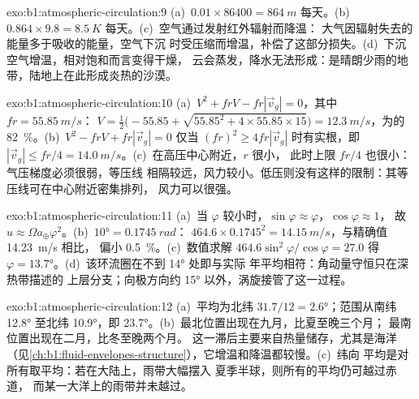 \begin{solution}{exo:b1:atmospheric-circulation:9}
(a)~$\num{0.01} \times \num{86400} = \qty{864}{m}$ 每天。(b)~$0.864 \times 9.8 =
\qty{8.5}{K}$ 每天。(c)~空气通过发射红外辐射而降温：
大气因辐射失去的能量多于吸收的能量，空气下沉
时受压缩而增温，补偿了这部分损失。(d)~下沉空气增温，相对饱和而言变得干燥，
云会蒸发，降水无法形成：是晴朗少雨的地带，陆地上在此形成炎热的沙漠。
\end{solution}

\begin{solution}{exo:b1:atmospheric-circulation:10}
(a)~$V^2 + frV - fr|\vec v_g| = 0$，其中 $fr = \qty{55.85}{m/s}$：
$V = \tfrac12\bigl(-55.85 + \sqrt{55.85^2 + 4 \times 55.85 \times 15}\bigr) =
\qty{12.3}{m/s}$，为的 \qty{82}{\percent}。(b)~$V^2 - frV +
fr|\vec v_g| = 0$ 仅当 $(fr)^2 \geq 4fr|\vec v_g|$ 时有实根，即
$|\vec v_g| \leq fr/4 = \qty{14.0}{m/s}$。(c)~在高压中心附近，$r$ 很小，
此时上限 $fr/4$ 也很小：气压梯度必须很弱，等压线
相隔较远，风力较小。低压则没有这样的限制：其等压线可在中心附近密集排列，
风力可以很强。
\end{solution}

\begin{solution}{exo:b1:atmospheric-circulation:11}
(a)~当 $\varphi$ 较小时，$\sin\varphi \approx \varphi$，$\cos\varphi \approx 1$，
故 $u \approx \Omega a_\oplus\varphi^2$。(b)~$\ang{10} = \qty{0.1745}{rad}$：
$464.6 \times 0.1745^2 = \qty{14.15}{m/s}$，与精确值 \qty{14.23}{m/s} 相比，
偏小 \qty{0.5}{\percent}。(c)~数值求解 $464.6\sin^2\varphi/\cos\varphi = 27.0$
得 $\varphi = \ang{13.7}$。(d)~该环流圈在不到 \ang{14} 处即与实际
年平均相符：角动量守恒只在深热带描述的
上层分支；向极方向约
\ang{15} 以外，涡旋接管了这一过程。
\end{solution}

\begin{solution}{exo:b1:atmospheric-circulation:12}
(a)~平均为北纬 $31.7/12 = \ang{2.6}$；范围从南纬 \ang{12.8} 至北纬 \ang{10.9}，即
\ang{23.7}。(b)~最北位置出现在九月，比夏至晚三个月；
最南位置出现在二月，比冬至晚两个月。
这一滞后主要来自热量储存，尤其是海洋
（见\cref{ch:b1:fluid-envelopes-structure}），它增温和降温都较慢。(c)~纬向
平均是对所有取平均：若在大陆上，雨带大幅摆入
夏季半球，则所有的平均仍可越过赤道，
而某一大洋上的雨带并未越过。
\end{solution}

